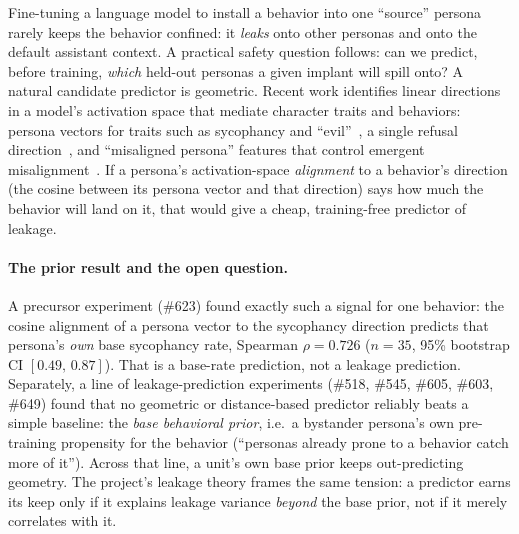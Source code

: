 \documentclass[11pt]{article}
\let\mathrho\rho
\renewcommand{\rho}{\ensuremath{\mathrho}}
\begin{document}
Fine-tuning a language model to install a behavior into one ``source'' persona rarely
keeps the behavior confined: it \emph{leaks} onto other personas and onto the default
assistant context. A practical safety question follows: can we predict, before
training, \emph{which} held-out personas a given implant will spill onto? A natural
candidate predictor is geometric. Recent work identifies linear directions in a
model's activation space that mediate character traits and behaviors: persona vectors
for traits such as sycophancy and ``evil''~\citep{chen2025persona}, a single refusal
direction~\citep{arditi2024refusal}, and ``misaligned persona'' features that control
emergent misalignment~\citep{wang2025persona,betley2025emergent}. If a persona's
activation-space \emph{alignment} to a behavior's direction (the cosine between its
persona vector and that direction) says how much the behavior will land on it, that
would give a cheap, training-free predictor of leakage.

\paragraph{The prior result and the open question.}
A precursor experiment (\#623) found exactly such a signal for one behavior:
the cosine alignment of a persona vector to the sycophancy direction predicts that
persona's \emph{own} base sycophancy rate, Spearman $\rho{=}0.726$ ($n{=}35$, 95\%
bootstrap CI $[0.49,\,0.87]$). That is a base-rate prediction, not a leakage
prediction. Separately, a line of leakage-prediction experiments (\#518, \#545, \#605,
\#603, \#649) found that no geometric or distance-based predictor reliably beats a
simple baseline: the \emph{base behavioral prior}, i.e.\ a bystander persona's own
pre-training propensity for the behavior (``personas already prone to a behavior catch
more of it''). Across that line, a unit's own base prior keeps out-predicting geometry.
The project's leakage theory frames the same tension: a predictor earns its keep only
if it explains leakage variance \emph{beyond} the base prior, not if it merely
correlates with it.
\end{document}
